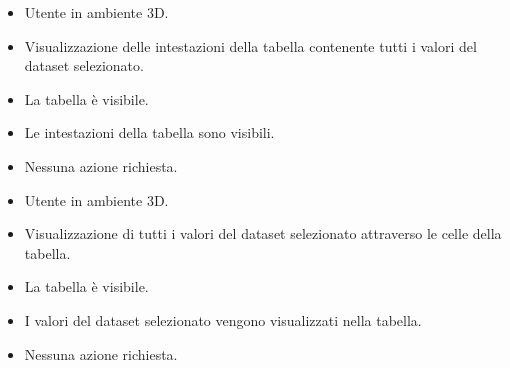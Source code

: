 \UCdsc
    { %
        \begin{itemize}
            \item Utente in ambiente 3D.
        \end{itemize}
    }
    { %
        \begin{itemize}
            \item Visualizzazione delle intestazioni della tabella contenente tutti i valori del dataset selezionato.
        \end{itemize}
    }
    { %
        \begin{itemize}
            \item La tabella è visibile.
        \end{itemize}
    }
    { %
        \begin{itemize}
            \item Le intestazioni della tabella sono visibili.
        \end{itemize}
    }
    { %
        \begin{itemize}
            \item Nessuna azione richiesta.
        \end{itemize}
    }

\UCdsc
    { %
        \begin{itemize}
            \item Utente in ambiente 3D.
        \end{itemize}
    }
    { %
        \begin{itemize}
            \item Visualizzazione di tutti i valori del dataset selezionato attraverso le celle della tabella.
        \end{itemize}
    }
    { %
        \begin{itemize}
            \item La tabella è visibile.
        \end{itemize}
    }
    { %
        \begin{itemize}
            \item I valori del dataset selezionato vengono visualizzati nella tabella.
        \end{itemize}
    }
    { %
        \begin{itemize}
            \item Nessuna azione richiesta.
        \end{itemize}
    }

